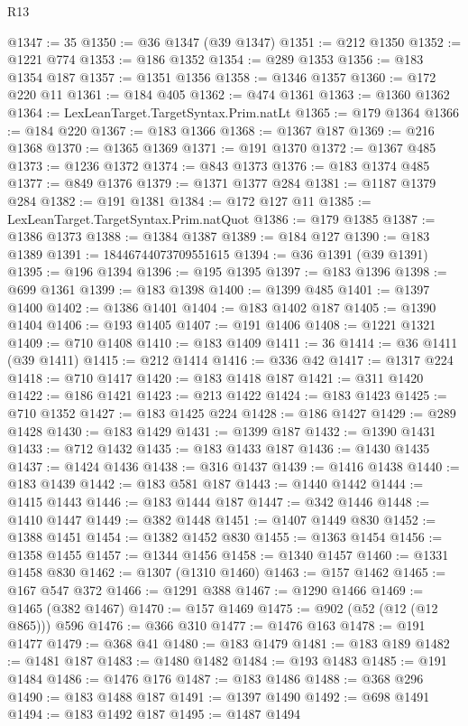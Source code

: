\begin{lexlean}{R13}
\begin{coremodule}
@1347 := 35
@1350 := @36 @1347 (@39 @1347)
@1351 := @212 @1350
@1352 := @1221 @774
@1353 := @186 @1352
@1354 := @289 @1353
@1356 := @183 @1354 @187
@1357 := @1351 @1356
@1358 := @1346 @1357
@1360 := @172 @220 @11
@1361 := @184 @405
@1362 := @474 @1361
@1363 := @1360 @1362
@1364 := LexLeanTarget.TargetSyntax.Prim.natLt
@1365 := @179 @1364
@1366 := @184 @220
@1367 := @183 @1366
@1368 := @1367 @187
@1369 := @216 @1368
@1370 := @1365 @1369
@1371 := @191 @1370
@1372 := @1367 @485
@1373 := @1236 @1372
@1374 := @843 @1373
@1376 := @183 @1374 @485
@1377 := @849 @1376
@1379 := @1371 @1377 @284
@1381 := @1187 @1379 @284
@1382 := @191 @1381
@1384 := @172 @127 @11
@1385 := LexLeanTarget.TargetSyntax.Prim.natQuot
@1386 := @179 @1385
@1387 := @1386 @1373
@1388 := @1384 @1387
@1389 := @184 @127
@1390 := @183 @1389
@1391 := 18446744073709551615
@1394 := @36 @1391 (@39 @1391)
@1395 := @196 @1394
@1396 := @195 @1395
@1397 := @183 @1396
@1398 := @699 @1361
@1399 := @183 @1398
@1400 := @1399 @485
@1401 := @1397 @1400
@1402 := @1386 @1401
@1404 := @183 @1402 @187
@1405 := @1390 @1404
@1406 := @193 @1405
@1407 := @191 @1406
@1408 := @1221 @1321
@1409 := @710 @1408
@1410 := @183 @1409
@1411 := 36
@1414 := @36 @1411 (@39 @1411)
@1415 := @212 @1414
@1416 := @336 @42
@1417 := @1317 @224
@1418 := @710 @1417
@1420 := @183 @1418 @187
@1421 := @311 @1420
@1422 := @186 @1421
@1423 := @213 @1422
@1424 := @183 @1423
@1425 := @710 @1352
@1427 := @183 @1425 @224
@1428 := @186 @1427
@1429 := @289 @1428
@1430 := @183 @1429
@1431 := @1399 @187
@1432 := @1390 @1431
@1433 := @712 @1432
@1435 := @183 @1433 @187
@1436 := @1430 @1435
@1437 := @1424 @1436
@1438 := @316 @1437
@1439 := @1416 @1438
@1440 := @183 @1439
@1442 := @183 @581 @187
@1443 := @1440 @1442
@1444 := @1415 @1443
@1446 := @183 @1444 @187
@1447 := @342 @1446
@1448 := @1410 @1447
@1449 := @382 @1448
@1451 := @1407 @1449 @830
@1452 := @1388 @1451
@1454 := @1382 @1452 @830
@1455 := @1363 @1454
@1456 := @1358 @1455
@1457 := @1344 @1456
@1458 := @1340 @1457
@1460 := @1331 @1458 @830
@1462 := @1307 (@1310 @1460)
@1463 := @157 @1462
@1465 := @167 @547 @372
@1466 := @1291 @388
@1467 := @1290 @1466
@1469 := @1465 (@382 @1467)
@1470 := @157 @1469
@1475 := @902 (@52 (@12 (@12 @865))) @596
@1476 := @366 @310
@1477 := @1476 @163
@1478 := @191 @1477
@1479 := @368 @41
@1480 := @183 @1479
@1481 := @183 @189
@1482 := @1481 @187
@1483 := @1480 @1482
@1484 := @193 @1483
@1485 := @191 @1484
@1486 := @1476 @176
@1487 := @183 @1486
@1488 := @368 @296
@1490 := @183 @1488 @187
@1491 := @1397 @1490
@1492 := @698 @1491
@1494 := @183 @1492 @187
@1495 := @1487 @1494

\end{coremodule}
\end{lexlean}
